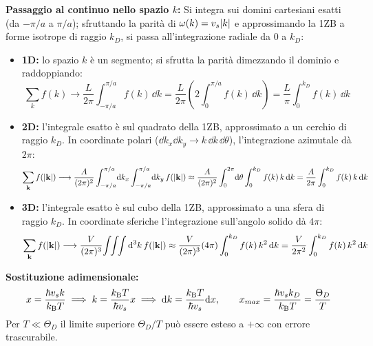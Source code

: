 \vspace{0.3cm}

\textbf{Passaggio al continuo nello spazio $k$:} Si integra sui domini cartesiani esatti (da $-\pi/a$ a $\pi/a$); sfruttando la parità di $\omega(k)=v_s|k|$ e approssimando la 1ZB a forme isotrope di raggio $k_D$, si passa all'integrazione radiale da $0$ a $k_D$:
\begin{itemize}
    \item \textbf{1D:} lo spazio $k$ è un segmento; si sfrutta la parità dimezzando il dominio e raddoppiando:
    \[ \sum_{k} f(k) \longrightarrow \frac{L}{2\pi}\int_{-\pi/a}^{\pi/a} f(k)\,\dd k
       = \frac{L}{2\pi}\left(2\int_0^{\pi/a} f(k)\,\dd k\right) = \frac{L}{\pi}\int_0^{k_D} f(k)\,\dd k \]
    \item \textbf{2D:} l'integrale esatto è sul quadrato della 1ZB, approssimato a un cerchio di raggio $k_D$. In coordinate polari ($\dd k_x\dd k_y \to k\,\dd k\,\dd\theta$), l'integrazione azimutale dà $2\pi$:
    \[ \sum_{\mathbf{k}} f(|\mathbf{k}|) \longrightarrow \frac{A}{(2\pi)^2}\int_{-\pi/a}^{\pi/a}\!\mathrm{d} k_x \int_{-\pi/a}^{\pi/a}\!\mathrm{d} k_y\, f(|\mathbf{k}|)
       \approx \frac{A}{(2\pi)^2}\int_0^{2\pi}\!\mathrm{d}\theta\int_0^{k_D} f(k)\,k\,\mathrm{d} k = \frac{A}{2\pi}\int_0^{k_D} f(k)\,k\,\mathrm{d} k \]
    \item \textbf{3D:} l'integrale esatto è sul cubo della 1ZB, approssimato a una sfera di raggio $k_D$. In coordinate sferiche l'integrazione sull'angolo solido dà $4\pi$:
    \[ \sum_{\mathbf{k}} f(|\mathbf{k}|) \longrightarrow \frac{V}{(2\pi)^3}\!\int\!\!\int\!\!\int \mathrm{d}^3k\, f(|\mathbf{k}|)
       \approx \frac{V}{(2\pi)^3}(4\pi)\int_0^{k_D} f(k)\,k^2\,\mathrm{d} k = \frac{V}{2\pi^2}\int_0^{k_D} f(k)\,k^2\,\mathrm{d} k \]
\end{itemize}

\noindent\textbf{Sostituzione adimensionale:} 
\[ x = \frac{\hbar v_s k}{k_{\mathrm{B}} T} \implies k = \frac{k_{\mathrm{B}} T}{\hbar v_s}x \implies \mathrm{d} k = \frac{k_{\mathrm{B}} T}{\hbar v_s}\mathrm{d} x, \qquad
   x_{max} = \frac{\hbar v_s k_D}{k_{\mathrm{B}} T} = \frac{\Theta_D}{T} \]
Per $T \ll \Theta_D$ il limite superiore $\Theta_D/T$ può essere esteso a $+\infty$ con errore trascurabile.

